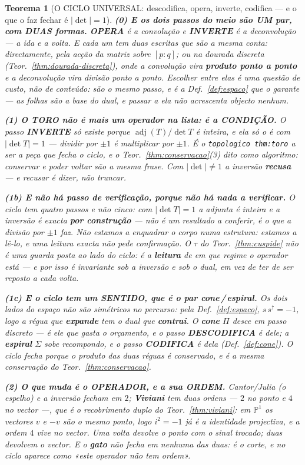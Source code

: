 \documentclass[11pt,a4paper]{article}
\newtheorem{teorema}{Teorema}
\newcommand{\code}[1]{\texttt{\small #1}}
\newcommand{\abs}[1]{\lvert #1\rvert}
\newcommand{\dg}{^{\dagger}}
\begin{document}
\begin{teorema}[O CICLO UNIVERSAL: descodifica, opera, inverte, codifica --- e o que o
faz fechar é $\abs{\det}=1$]
\textbf{(0) E os dois passos do meio são UM par, com DUAS formas.} \textbf{OPERA} é a
convolução e \textbf{INVERTE} é a deconvolução --- a ida e a volta. E cada um tem duas
escritas que são a mesma conta: \emph{directamente}, pela acção da matriz sobre $[p:q]$;
ou \emph{na dourada discreta} (Teor.~\ref{thm:dourada-discreta}), onde a convolução vira
\textbf{produto ponto a ponto} e a deconvolução vira divisão ponto a ponto. \emph{Escolher
entre elas é uma questão de custo, não de conteúdo}: são o mesmo passo, e é a
Def.~\ref{def:espaco} que o garante --- as folhas são a base do dual, e passar a ela não
acrescenta objecto nenhum.

\textbf{(1) O TORO não é mais um operador na lista: é a CONDIÇÃO.} O passo
\textbf{INVERTE} só existe porque $\operatorname{adj}(T)/\det T$ é \emph{inteira}, e ela
só o é com $\abs{\det T}=1$ --- dividir por $\pm1$ é multiplicar por $\pm1$. É o
\code{topologico thm:toro} a ser a peça que fecha o ciclo, e o
Teor.~\ref{thm:conservacao}(3) dito como algoritmo: \emph{conservar e poder voltar são a
mesma frase}. Com $\abs{\det}\neq1$ a inversão \textbf{recusa} --- e recusar é dizer, não
truncar.

\textbf{(1b) E não há passo de verificação, porque não há nada a verificar.} O ciclo tem
\emph{quatro} passos e não cinco: com $\abs{\det T}=1$ a adjunta é inteira e a inversão é
exacta \textbf{por construção} --- não é um resultado a conferir, é o que a divisão por
$\pm1$ faz. \emph{Não estamos a enquadrar o corpo numa estrutura: estamos a lê-lo}, e uma
leitura exacta não pede confirmação. O $\tau$ do Teor.~\ref{thm:cuspide} não é uma guarda
posta ao lado do ciclo: é a \textbf{leitura} de em que regime o operador está --- e por isso
é invariante sob a inversão e sob o dual, em vez de ter de ser reposto a cada volta.

\textbf{(1c) E o ciclo tem um SENTIDO, que é o par cone\,/\,espiral.} Os dois lados do
espaço não são simétricos no percurso: pela Def.~\ref{def:espaco}, $s\,s\dg=-1$, logo a
régua que \textbf{expande} tem o dual que \textbf{contrai}. O \textbf{cone} $\Pi$ desce em
passo discreto --- é ele que \emph{gasta} o orçamento, e o passo \textbf{DESCODIFICA} é
dele; a \textbf{espiral} $\Sigma$ sobe recompondo, e o passo \textbf{CODIFICA} é dela
(Def.~\ref{def:cone}). \emph{O ciclo fecha porque o produto das duas réguas é conservado},
e é a mesma conservação do Teor.~\ref{thm:conservacao}.

\textbf{(2) O que muda é o OPERADOR, e a sua ORDEM.} Cantor/Julia (o espelho) e a
inversão fecham em $2$; \textbf{Viviani} tem \emph{duas} ordens --- $2$ no ponto e $4$ no
vector ---, que é o recobrimento duplo do Teor.~\ref{thm:viviani}: em $\mathbb{P}^1$ os
vectores $v$ e $-v$ são o \emph{mesmo ponto}, logo $i^{2}=-1$ já é a identidade
projectiva, e a ordem $4$ vive no vector. \emph{Uma volta devolve o ponto com o sinal
trocado; duas devolvem o vector.} E o \textbf{gato} não fecha em nenhuma das duas: é o
corte, e no ciclo aparece como \emph{«este operador não tem ordem»}.


\end{teorema}
\end{document}
